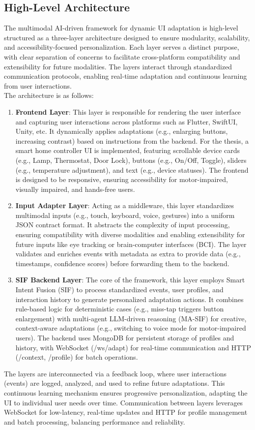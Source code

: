 \documentclass[openany]{book}
\begin{document}
    \subsection{High-Level Architecture}
    The multimodal AI-driven framework for dynamic UI adaptation is high-level structured as a three-layer architecture designed to ensure modularity, scalability, and accessibility-focused personalization. Each layer serves a distinct purpose, with clear separation of concerns to facilitate cross-platform compatibility and extensibility for future modalities. The layers interact through standardized communication protocols, enabling real-time adaptation and continuous learning from user interactions. \\
    The architecture is as follows:
\begin{enumerate}
    \item \textbf{Frontend Layer}: This layer is responsible for rendering the user interface and capturing user interactions across platforms such as Flutter, SwiftUI, Unity, etc. It dynamically applies adaptations (e.g., enlarging buttons, increasing contrast) based on instructions from the backend. For the thesis, a smart home controller UI is implemented, featuring scrollable device cards (e.g., Lamp, Thermostat, Door Lock), buttons (e.g., On/Off, Toggle), sliders (e.g., temperature adjustment), and text (e.g., device statuses). The frontend is designed to be responsive, ensuring accessibility for motor-impaired, visually impaired, and hands-free users.
    \item \textbf{Input Adapter Layer}: Acting as a middleware, this layer standardizes multimodal inputs (e.g., touch, keyboard, voice, gestures) into a uniform JSON contract format. It abstracts the complexity of input processing, ensuring compatibility with diverse modalities and enabling extensibility for future inputs like eye tracking or brain-computer interfaces (BCI). The layer validates and enriches events with metadata as extra to provide data (e.g., timestamps, confidence scores) before forwarding them to the backend.
    \item \textbf{SIF Backend Layer}: The core of the framework, this layer employs Smart Intent Fusion (SIF) to process standardized events, user profiles, and interaction history to generate personalized adaptation actions. It combines rule-based logic for deterministic cases (e.g., miss-tap triggers button enlargement) with multi-agent LLM-driven reasoning (MA-SIF) for creative, context-aware adaptations (e.g., switching to voice mode for motor-impaired users). The backend uses MongoDB for persistent storage of profiles and history, with WebSocket (/ws/adapt) for real-time communication and HTTP (/context, /profile) for batch operations.
\end{enumerate}
The layers are interconnected via a feedback loop, where user interactions (events) are logged, analyzed, and used to refine future adaptations. This continuous learning mechanism ensures progressive personalization, adapting the UI to individual user needs over time. Communication between layers leverages WebSocket for low-latency, real-time updates and HTTP for profile management and batch processing, balancing performance and reliability.
\end{document}
